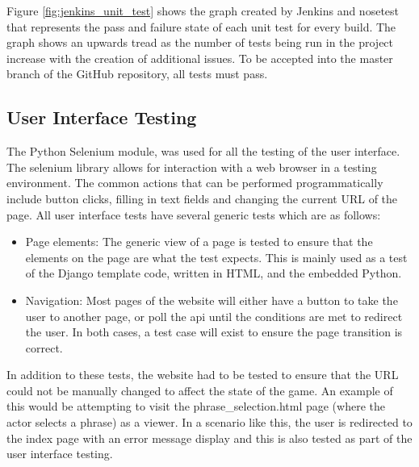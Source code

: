 Figure \ref{fig:jenkins_unit_test} shows the graph created by Jenkins and nosetest that represents the pass and failure state of each unit test for every build. The graph shows an upwards tread as the number of tests being run in the project increase with the creation of additional issues. To be accepted into the master branch of the GitHub repository, all tests must pass.

\begin{figure}[h!]
\end{figure}

\subsection{User Interface Testing}
The Python Selenium module,  was used for all the testing of the user interface. The selenium library allows for interaction with a web browser in a testing environment. The common actions that can be performed programmatically include button clicks, filling in text fields and changing the current URL of the page. All user interface tests have several generic tests which are as follows:
\begin{itemize}
	\item Page elements: The generic view of a page is tested to ensure that the elements on the page are what the test expects. This is mainly used as a test of the Django template code, written in HTML, and the embedded Python.
	\item Navigation: Most pages of the website will either have a button to take the user to another page, or poll the api until the conditions are met to redirect the user. In both cases, a test case will exist to ensure the page transition is correct. 
\end{itemize}
In addition to these tests, the website had to be tested to ensure that the URL could not be manually changed to affect the state of the game. An example of this would be attempting to visit the phrase\_selection.html page (where the actor selects a phrase) as a viewer.  In a scenario like this, the user is redirected to the index page with an error message display and this is also tested as part of the user interface testing.

